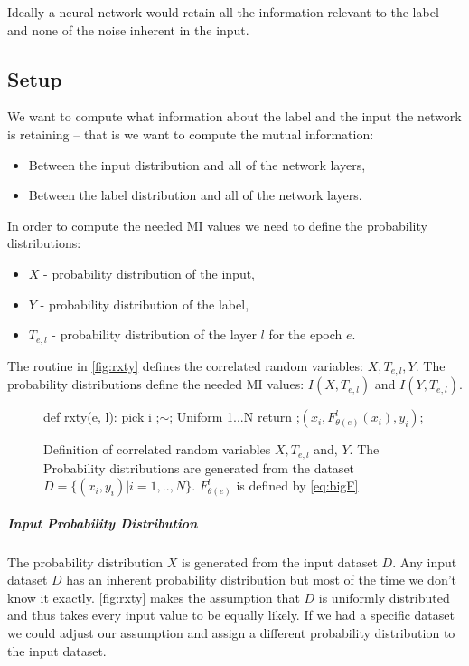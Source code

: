 \documentclass[dissertation.tex]{subfiles}
\begin{document}
Ideally a neural network would retain all the information relevant to the label
and none of the noise inherent in the input.

\subsection{Setup}
\label{subIPsetup}

We want to compute what information about the label and the input the network is
retaining -- that is we want to compute the mutual information:
\begin{itemize}
  \item{
      Between the input distribution and all of the network layers,
    }
  \item{
      Between the label distribution and all of the network layers.
    }
\end{itemize}

In order to compute the needed MI values we need to define the probability
distributions:
\begin{itemize}
  \item{
      $X$ - probability distribution of the input,
    }
  \item{
      $Y$ - probability distribution of the label,
    }
  \item{
      $T_{e,l}$ - probability distribution of the layer $l$ for the epoch $e$.
    }
\end{itemize}

The routine in \autoref{fig:rxty} defines the correlated random variables:
$X,T_{e,l},Y$. The probability distributions define the needed MI values:
$I(X, T_{e,l})$ and $I(Y, T_{e,l})$.

\begin{figure}[H]
    \begin{pythonfigure}
      def rxty(e, l):
        pick i ;$\sim$; Uniform {1...N}
        return ;$(x_i, F_{\theta(e)}^l(x_i), y_i)$;
    \end{pythonfigure}
    \caption{
      Definition of correlated random variables $X, T_{e,l}$ and, $Y$. The
      Probability distributions are generated from the dataset $D=\{(x_i,
      y_i)|i=1,..,N\}$. $F_{\theta(e)}^l$ is defined by \autoref{eq:bigF}
    }
    \label{fig:rxty}
\end{figure}

\subparagraph{Input Probability Distribution} The probability distribution $X$
is generated from the input dataset $D$.  Any input dataset $D$ has an inherent
probability distribution but most of the time we don't know it exactly.
\autoref{fig:rxty} makes the assumption that $D$ is uniformly distributed and
thus takes every input value to be equally likely.  If we had a specific dataset
we could adjust our assumption and assign a different probability distribution
to the input dataset.
\end{document}
